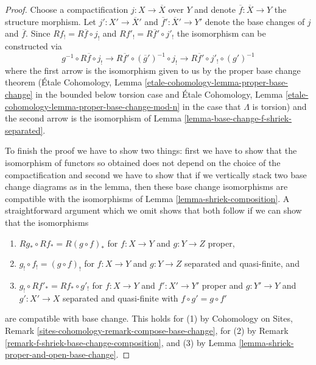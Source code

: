 \begin{proof}
Choose a compactification $j : X \to \overline{X}$ over $Y$
and denote $\overline{f} : \overline{X} \to Y$ the structure morphism.
Let $j' : X' \to \overline{X}'$ and $\overline{f}' : \overline{X}' \to Y'$
denote the base changes of $j$ and $\overline{f}$.
Since $Rf_! = R\overline{f} \circ j_!$ and $Rf'_! = R\overline{f}' \circ j'_!$
the isomorphism can be constructed via
$$
g^{-1} \circ R\overline{f} \circ j_! \to
R\overline{f}' \circ (\overline{g}')^{-1} \circ j_! \to
R\overline{f}' \circ j'_! \circ (g')^{-1} 
$$
where the first arrow is the isomorphism given to us by the
proper base change theorem (\'Etale Cohomology, Lemma
\ref{etale-cohomology-lemma-proper-base-change} in the bounded below torsion
case and \'Etale Cohomology, Lemma
\ref{etale-cohomology-lemma-proper-base-change-mod-n} in the
case that $\Lambda$ is torsion) and the second arrow is the isomorphism of
Lemma \ref{lemma-base-change-f-shriek-separated}.

\medskip\noindent
To finish the proof we have to show two things: first we have to show
that the isomorphism of functors so obtained does not depend on
the choice of the compactification and second we have to show that
if we vertically stack two base change diagrams as in the lemma, then
these base change isomorphisms are compatible with the isomorphisms
of Lemma \ref{lemma-shriek-composition}.
A straightforward argument which we omit shows that both follow
if we can show that the isomorphisms
\begin{enumerate}
\item $Rg_* \circ Rf_* = R(g \circ f)_*$ for $f : X \to Y$ and $g : Y \to Z$
proper,
\item $g_! \circ f_! = (g \circ f)_!$ for $f : X \to Y$ and $g : Y \to Z$
separated and quasi-finite, and
\item $g_! \circ Rf'_* = Rf_* \circ g'_!$ for  $f : X \to Y$ and
$f' : X' \to Y'$ proper and $g : Y' \to Y$ and $g' : X' \to X$
separated and quasi-finite with $f \circ g' = g \circ f'$
\end{enumerate}
are compatible with base change. This holds for (1) by
Cohomology on Sites, Remark \ref{sites-cohomology-remark-compose-base-change},
for (2) by Remark \ref{remark-f-shriek-base-change-composition}, and
(3) by Lemma \ref{lemma-shriek-proper-and-open-base-change}.
\end{proof}















